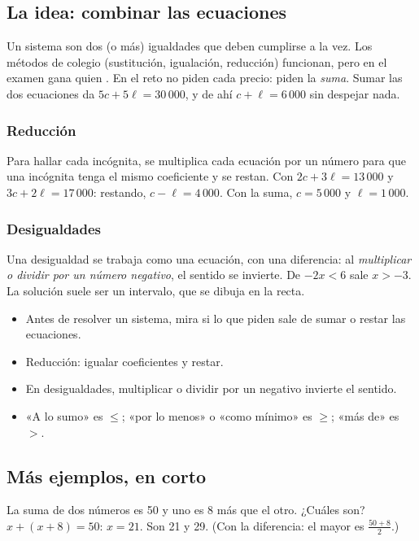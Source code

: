 \subsection{La idea: combinar las ecuaciones}
Un sistema son dos (o más) igualdades que deben cumplirse a la vez. Los métodos de colegio (sustitución, igualación,
reducción) funcionan, pero en el examen gana quien . En el reto no piden cada precio: piden la
\emph{suma}. Sumar las dos ecuaciones da $5c + 5\ell = 30\,000$, y de ahí $c + \ell = 6\,000$ sin despejar nada.

\subsubsection{Reducción}
Para hallar cada incógnita, se multiplica cada ecuación por un número para que una incógnita tenga el mismo coeficiente
y se restan. Con $2c + 3\ell = 13\,000$ y $3c + 2\ell = 17\,000$: restando, $c - \ell = 4\,000$. Con la suma,
$c = 5\,000$ y $\ell = 1\,000$.

\subsubsection{Desigualdades}
Una desigualdad se trabaja como una ecuación, con una diferencia: al \emph{multiplicar o dividir por un número
negativo}, el sentido se invierte. De $-2x < 6$ sale $x > -3$. La solución suele ser un intervalo, que se dibuja en la
recta.


\begin{regla}
\begin{itemize}
  \item Antes de resolver un sistema, mira si lo que piden sale de sumar o restar las ecuaciones.
  \item Reducción: igualar coeficientes y restar.
  \item En desigualdades, multiplicar o dividir por un negativo invierte el sentido.
  \item «A lo sumo» es $\le$; «por lo menos» o «como mínimo» es $\ge$; «más de» es $>$.
\end{itemize}
\end{regla}

\subsection{Más ejemplos, en corto}
\begin{ejemplo}[Sustitución]
La suma de dos números es 50 y uno es 8 más que el otro. ¿Cuáles son?
\solucion $x + (x + 8) = 50$: $x = 21$. Son 21 y 29. (Con la diferencia: el mayor es $\tfrac{50 + 8}{2}$.)
\end{ejemplo}

